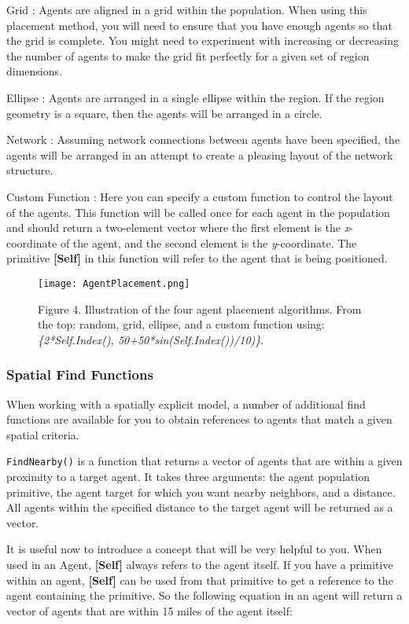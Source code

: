 \documentclass[]{memoir}
\let\Oldincludegraphics\includegraphics
\renewcommand{\includegraphics}[1]{\Oldincludegraphics[max size={\textwidth}{\textheight}]{#1}}
\newcommand{\p}[1]{\textbf{{[}#1{]}}}
\begin{document}
Grid : Agents are aligned in a grid within the population. When using
this placement method, you will need to ensure that you have enough
agents so that the grid is complete. You might need to experiment with
increasing or decreasing the number of agents to make the grid fit
perfectly for a given set of region dimensions.

Ellipse : Agents are arranged in a single ellipse within the region. If
the region geometry is a square, then the agents will be arranged in a
circle.

Network : Assuming network connections between agents have been
specified, the agents will be arranged in an attempt to create a
pleasing layout of the network structure.

Custom Function : Here you can specify a custom function to control the
layout of the agents. This function will be called once for each agent
in the population and should return a two-element vector where the first
element is the \emph{x}-coordinate of the agent, and the second element
is the \emph{y}-coordinate. The primitive \p{Self} in this function will
refer to the agent that is being positioned.

\begin{figure}[htbp]
\centering
\texttt{[image: AgentPlacement.png]}
\caption{Figure 4. Illustration of the four agent placement algorithms.
From the top: random, grid, ellipse, and a custom function using:
\emph{\{2*Self.Index(), 50+50*sin(Self.Index())/10)\}}.}
\end{figure}

\subsubsection{Spatial Find Functions}

When working with a spatially explicit model, a number of additional
find functions are available for you to obtain references to agents that
match a given spatial criteria.

\lstinline!FindNearby()! is a function that returns a vector of agents
that are within a given proximity to a target agent. It takes three
arguments: the agent population primitive, the agent target for which
you want nearby neighbors, and a distance. All agents within the
specified distance to the target agent will be returned as a vector.

It is useful now to introduce a concept that will be very helpful to
you. When used in an Agent, \p{Self} always refers to the agent itself.
If you have a primitive within an agent, \p{Self} can be used from that
primitive to get a reference to the agent containing the primitive. So
the following equation in an agent will return a vector of agents that
are within 15 miles of the agent itself:
\end{document}

